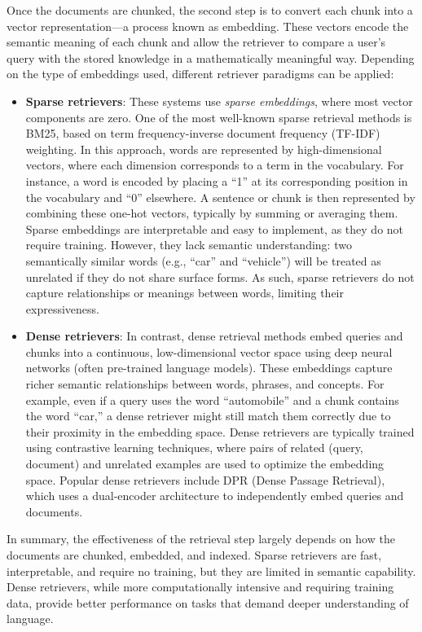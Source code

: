Once the documents are chunked, the second step is to convert each chunk into a vector representation—a process known as embedding. These vectors encode the semantic meaning of each chunk and allow the retriever to compare a user's query with the stored knowledge in a mathematically meaningful way. Depending on the type of embeddings used, different retriever paradigms can be applied:
\begin{itemize}
    \item \textbf{Sparse retrievers}: These systems use \textit{sparse embeddings}, where most vector components are zero. One of the most well-known sparse retrieval methods is BM25, based on term frequency-inverse document frequency (TF-IDF) weighting. In this approach, words are represented by high-dimensional vectors, where each dimension corresponds to a term in the vocabulary. For instance, a word is encoded by placing a “1” at its corresponding position in the vocabulary and “0” elsewhere. A sentence or chunk is then represented by combining these one-hot vectors, typically by summing or averaging them. Sparse embeddings are interpretable and easy to implement, as they do not require training. However, they lack semantic understanding: two semantically similar words (e.g., “car” and “vehicle”) will be treated as unrelated if they do not share surface forms. As such, sparse retrievers do not capture relationships or meanings between words, limiting their expressiveness.
    \item \textbf{Dense retrievers}: In contrast, dense retrieval methods embed queries and chunks into a continuous, low-dimensional vector space using deep neural networks (often pre-trained language models). These embeddings capture richer semantic relationships between words, phrases, and concepts. For example, even if a query uses the word “automobile” and a chunk contains the word “car,” a dense retriever might still match them correctly due to their proximity in the embedding space. Dense retrievers are typically trained using contrastive learning techniques, where pairs of related (query, document) and unrelated examples are used to optimize the embedding space. Popular dense retrievers include DPR (Dense Passage Retrieval), which uses a dual-encoder architecture to independently embed queries and documents.
\end{itemize}
In summary, the effectiveness of the retrieval step largely depends on how the documents are chunked, embedded, and indexed. Sparse retrievers are fast, interpretable, and require no training, but they are limited in semantic capability. Dense retrievers, while more computationally intensive and requiring training data, provide better performance on tasks that demand deeper understanding of language.

